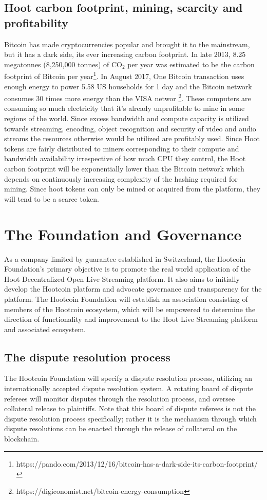 \documentclass{article}
\begin{document}
\subsection{Hoot carbon footprint, mining, scarcity and profitability}
Bitcoin has made cryptocurrencies popular and brought it to the mainstream, but it has a dark side, its ever increasing carbon footprint. In late 2013, 8.25 megatonnes (8,250,000 tonnes) of CO$_2$ per year
was estimated to be the carbon footprint of Bitcoin per year\footnote{https://pando.com/2013/12/16/bitcoin-has-a-dark-side-its-carbon-footprint/}. In August 2017, One Bitcoin transaction uses enough energy to power 5.58 US households for 1 day and the  Bitcoin network consumes 30 times more energy than the VISA networ \footnote{https://digiconomist.net/bitcoin-energy-consumption}. These
computers are consuming so much electricity that it’s already
unprofitable to mine in some regions of the world. Since excess
bandwidth and compute capacity is utilized towards streaming,
encoding, object recognition
and security of video and audio streams the resources otherwise would
be utilized are profitably used.  Since Hoot tokens are fairly distributed to miners corresponding to their compute and bandwidth availability irrespective of how much CPU they control, the Hoot carbon footprint will be exponentially lower than the Bitcoin network which depends on continuously increasing complexity of the hashing required for mining. Since hoot tokens can only be mined or acquired from the platform, they will tend to be a scarce token.

\section{The Foundation and Governance} %
\label{sec:the_foundation_and_governance}
As a company limited by guarantee established in Switzerland, the Hootcoin Foundation's primary objective is to promote the real world application of the Hoot Decentralized Open Live Streaming platform. It also aims to initially develop the Hootcoin platform and advocate governance and transparency for the platform. The Hootcoin Foundation will establish an association consisting of members of the Hootcoin ecosystem, which will be empowered to determine the direction of functionality and improvement to the Hoot Live Streaming platform and associated ecosystem.

\subsection{The dispute resolution process} %
\label{sub:the_dispute_resolution_process}
The Hootcoin Foundation will specify a dispute resolution process, utilizing an internationally accepted dispute resolution system. A rotating board of dispute referees will monitor disputes through the resolution process, and oversee collateral release to plaintiffs. Note that this board of dispute referees is not the dispute resolution process specifically; rather it is the mechanism through which dispute resolutions can be enacted through the release of collateral on the blockchain.
\end{document}
